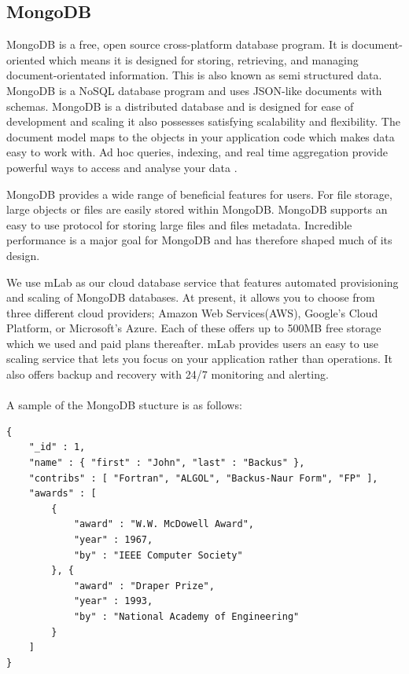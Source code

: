 \subsection{MongoDB}
MongoDB is a free, open source cross-platform database program. It is document-oriented which means it is designed for storing, retrieving, and managing document-orientated information. This is also known as semi structured data. MongoDB is a NoSQL database program and uses JSON-like documents with schemas. MongoDB is a distributed database and is designed for ease of development and scaling it also possesses satisfying scalability and flexibility. The document model maps to the objects in your application code which makes data easy to work with. Ad hoc queries, indexing, and real time aggregation provide powerful ways to access and analyse your data \cite{MongoAbout}. \par MongoDB provides a wide range of beneficial features for users. For file storage, large objects or files are easily stored within MongoDB. MongoDB supports an easy to use protocol for storing large files and files metadata. Incredible performance is a major goal for MongoDB and has therefore shaped much of its design\cite{KristinaChodorw}. \par We use mLab as our cloud database service that features automated provisioning and scaling of MongoDB databases. At present, it allows you to choose from three different cloud providers; Amazon Web Services(AWS), Google's Cloud Platform, or Microsoft's Azure. Each of these offers up to 500MB free storage which we used and paid plans thereafter. mLab provides users an easy to use scaling service that lets you focus on your application rather than operations. It also offers backup and recovery with 24/7 monitoring and alerting\cite{mLab}.\\
\\
A sample of the MongoDB stucture is as follows\cite{WilliamZola}:
\begin{verbatim}
{
    "_id" : 1,
    "name" : { "first" : "John", "last" : "Backus" },
    "contribs" : [ "Fortran", "ALGOL", "Backus-Naur Form", "FP" ],
    "awards" : [
        {
            "award" : "W.W. McDowell Award",
            "year" : 1967,
            "by" : "IEEE Computer Society"
        }, {
            "award" : "Draper Prize",
            "year" : 1993,
            "by" : "National Academy of Engineering"
        }
    ]
}
\end{verbatim}

